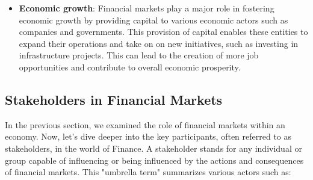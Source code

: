 \documentclass{article}
\begin{document}
\begin{itemize}
     \item \textbf{Economic growth}: Financial markets play a major role in fostering economic growth by providing capital to various economic actors such as companies and governments. This provision  of capital enables these entities to expand their operations and take on on new initiatives, such as investing in infrastructure projects. This can lead to the creation of more job opportunities and contribute to overall economic prosperity.
\end{itemize}

\subsection{Stakeholders in Financial Markets} 
In the previous section, we examined the role of financial markets within an economy. Now, let's dive deeper into the key participants, often referred to as stakeholders, in the world of Finance. A stakeholder stands for any individual or group capable of influencing or being influenced by the actions and consequences of financial markets. This "umbrella term" summarizes various actors such as:
\end{document}
